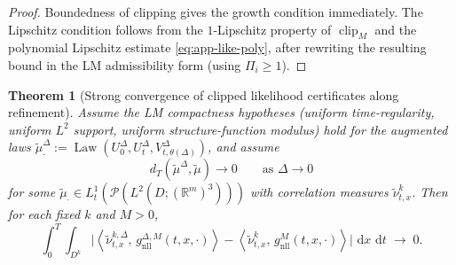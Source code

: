 \documentclass{article}
\numberwithin{equation}{section}
\theoremstyle{plain}
\newtheorem{theorem}{Theorem}[section]
\theoremstyle{definition}
\theoremstyle{remark}
\newcommand{\R}{\mathbb{R}}
\newcommand{\Pcal}{\mathcal{P}}
\newcommand{\dd}{\,\mathrm{d}}
\DeclareMathOperator{\Law}{Law}
\newcommand{\ip}[2]{\left\langle #1,\,#2 \right\rangle}
\DeclareMathOperator{\clip}{clip}
\begin{document}
\begin{proof}
Boundedness of clipping gives the growth condition immediately. The Lipschitz condition follows from the $1$-Lipschitz
property of $\clip_M$ and the polynomial Lipschitz estimate \eqref{eq:app-like-poly}, after rewriting the resulting bound
in the LM admissibility form (using $\Pi_i\ge1$).
\end{proof}

\begin{theorem}[Strong convergence of clipped likelihood certificates along refinement]
\label{thm:app-gnll-conv}
Assume the LM compactness hypotheses (uniform time-regularity, uniform $L^2$ support, uniform structure-function modulus)
hold for the augmented laws $\widetilde\mu^\Delta_{\cdot}:=\Law(U_0^\Delta,U_t^\Delta,V^\Delta_{t,\theta(\Delta)})$, and assume
\begin{equation}\label{eq:app-mu-tilde-conv}
d_T(\widetilde\mu^\Delta,\widetilde\mu)\to0
\qquad\text{as }\Delta\to0
\end{equation}
for some $\widetilde\mu_\cdot\in L^1_t(\Pcal(L^2(D;(\R^m)^3)))$ with correlation measures $\widetilde\nu^k_{t,x}$.
Then for each fixed $k$ and $M>0$,
\[
\int_0^T\int_{D^k}
\bigl|
\ip{\widetilde\nu^{k,\Delta}_{t,x}}{g^{\Delta,M}_{\mathrm{nll}}(t,x,\cdot)}
-
\ip{\widetilde\nu^{k}_{t,x}}{g^{M}_{\mathrm{nll}}(t,x,\cdot)}
\bigr|\,\dd x\,\dd t
\;\longrightarrow\;0.
\]
\end{theorem}
\end{document}
